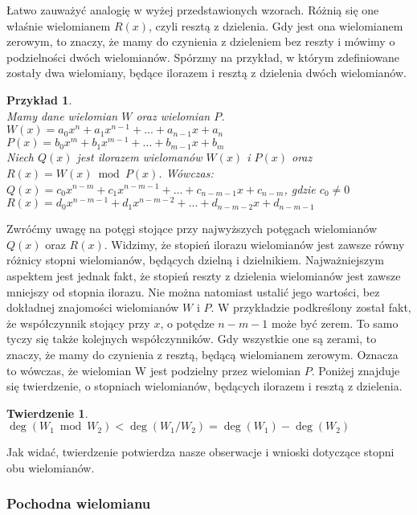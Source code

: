 \documentclass[oneside,a4paper]{book}
\newtheorem{theorem}{Twierdzenie}
\newtheorem{example}{Przykład}
\begin{document}
	Łatwo zauważyć analogię w wyżej przedstawionych wzorach. Różnią się one właśnie wielomianem $R(x)$, czyli resztą z dzielenia. Gdy jest ona wielomianem zerowym, to znaczy, że mamy do czynienia z dzieleniem bez reszty i mówimy o podzielności dwóch wielomianów. Spórzmy na przykład, w którym zdefiniowane zostały dwa wielomiany, będące ilorazem i resztą z dzielenia dwóch wielomianów.
	
	\begin{example}
		$ $\\
		Mamy dane wielomian $W$ oraz wielomian $P$. \\
		$W(x) = a_0x^n + a_1x^{n-1} + ... + a_{n-1}x + a_n$ \\
		$P(x) = b_0x^m + b_1x^{m-1} + ... + b_{m-1}x + b_m$ \\
		Niech $Q(x)$ jest ilorazem wielomanów $W(x)$ i $P(x)$ oraz $R(x) = W(x)\bmod P(x)$. Wówczas: \\
		$Q(x) = c_0x^{n-m} + c_1x^{n-m-1} + ... + c_{n-m-1}x + c_{n-m}$, gdzie $c_0\ne 0$ \\
		$R(x) = d_0x^{n-m-1} + d_1x^{n-m-2} + ... + d_{n-m-2}x + d_{n-m-1}$
	\end{example}
	
	Zwróćmy uwagę na potęgi stojące przy najwyższych potęgach wielomianów $Q(x)$ oraz $R(x)$. Widzimy, że stopień ilorazu wielomianów jest zawsze równy różnicy stopni wielomianów, będących dzielną i dzielnikiem. Najważniejszym aspektem jest jednak fakt, że stopień reszty z dzielenia wielomianów jest zawsze mniejszy od stopnia ilorazu. Nie można natomiast ustalić jego wartości, bez dokładnej znajomości wielomianów $W$ i $P$. W przykładzie podkreślony został fakt, że współczynnik stojący przy $x$, o potędze $n-m-1$ może być zerem. To samo tyczy się także kolejnych współczynników. Gdy wszystkie one są zerami, to znaczy, że mamy do czynienia z resztą, będącą wielomianem zerowym. Oznacza to wówczas, że wielomian W jest podzielny przez wielomian $P$. Poniżej znajduje się twierdzenie, o stopniach wielomianów, będących ilorazem i resztą z dzielenia.
	
	\begin{theorem}
		$ $\\
		$\deg(W_1 \bmod W_2) < \deg(W_1 / W_2) = \deg(W_1) - \deg(W_2)$
	\end{theorem}
	
	Jak widać, twierdzenie potwierdza nasze obserwacje i wnioski dotyczące stopni obu wielomianów.
	
	\subsubsection{Pochodna wielomianu}
	
\end{document}
